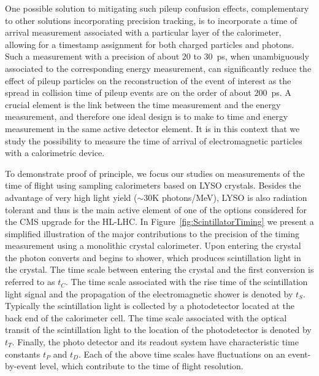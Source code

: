 \documentclass[12pt]{article}
\begin{document}
One possible solution to mitigating such pileup confusion effects,
complementary to other solutions incorporating precision tracking,
is to incorporate a time of arrival measurement associated with a
particular layer of the calorimeter, allowing for a timestamp
assignment for both charged particles and photons. Such a measurement
with a precision of about $20$ to $30$~ps, when unambiguously
associated to the corresponding energy measurement, can significantly reduce
the effect of pileup particles on the reconstruction of the
event of interest as the spread in collision time of pileup events
are on the order of about $200$~ps. A crucial element is
the link between the time measurement and the energy measurement,
and therefore one ideal design is to make to time and energy
measurement in the same active detector element. It is in this context 
that we study the possibility to measure the time of arrival of 
electromagnetic particles with a calorimetric device.

To demonstrate proof of principle, we focus our studies on
measurements of the time of flight using sampling calorimeters
based on LYSO crystals. Besides the advantage of very high light
yield ($\sim 30$K photons/MeV), LYSO is also radiation tolerant and
thus is the main active element of one of the options considered 
for the CMS upgrade for the HL-LHC. In Figure~\ref{fig:ScintillatorTiming} 
we present a simplified illustration of the major contributions to the 
precision of the timing measurement using a monolithic crystal calorimeter.
Upon entering the crystal the photon converts and begins to shower,
which produces scintillation light in the crystal. The time scale
between entering the crystal and the first conversion is referred to
as $t_C$. The time scale associated with the rise time of the scintillation 
light signal and the propagation of the electromagnetic shower is denoted
by $t_S$. Typically the scintillation light is collected by a photodetector
located at the back end of the calorimeter cell. The time scale associated
with the optical transit of the scintillation light to the location of the
photodetector is denoted by $t_T$. Finally, the photo detector and
its readout system have characteristic time constants $t_P$ and $t_D$.
Each of the above time scales have fluctuations on an event-by-event
level, which contribute to the time of flight resolution.
\end{document}
